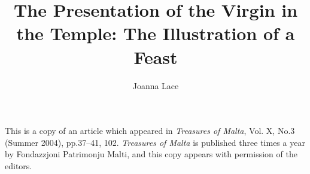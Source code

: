 \documentclass[a4paper,12pt]{article}
\begin{document}
\title{The Presentation of the Virgin in the Temple: The Illustration of a
Feast}
\author{Joanna Lace}
\date{}
\maketitle

{\narrower
This is a copy of an article which appeared in
{\it Treasures of Malta},
Vol. X, No.3 (Summer 2004), pp.37--41, 102. 
{\it Treasures of Malta} is published three times a year by
Fondazzjoni Patrimonju Malti, and this copy appears with permission of
the editors.
}
\end{document}
